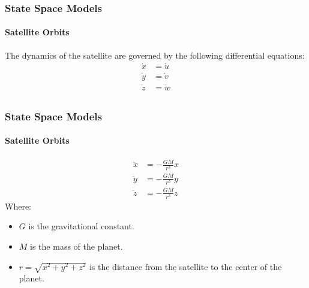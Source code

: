 \begin{frame}
	\begin{itemize}
	\end{itemize}		
\end{frame}

\begin{frame}
	\frametitle{State Space Models}
\framesubtitle{Satellite Orbits}
	The dynamics of the satellite are governed by the following differential equations:
	\begin{align*}
	\dot{x} &= \dot{u} \\
	\dot{y} &= \dot{v} \\
	\dot{z} &= \dot{w} \\
	\end{align*}
\end{frame}

\begin{frame}
	\frametitle{State Space Models}
\framesubtitle{Satellite Orbits}
	\begin{align*}
	\ddot{x} &= -\frac{GM}{r^3}x \\
	\ddot{y} &= -\frac{GM}{r^3}y \\
	\ddot{z} &= -\frac{GM}{r^3}z
	\end{align*}
	Where:
	\begin{itemize}
		\item \(G\) is the gravitational constant.
		\item \(M\) is the mass of the planet.
		\item \(r = \sqrt{x^2 + y^2 + z^2}\) is the distance from the satellite to the center of the planet.
	\end{itemize}
\end{frame}
